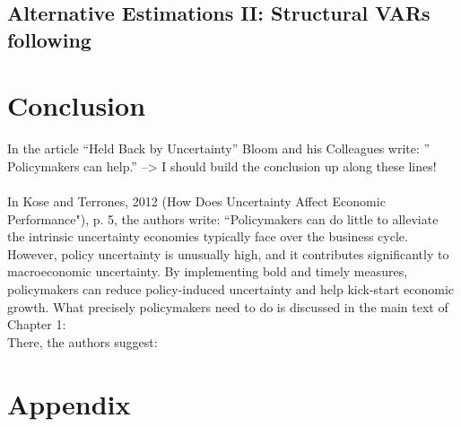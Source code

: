 \documentclass[a4paper,11pt,listof=nochaptergap,oneside,pointednumbers,bibtotoc,bigheadings,liststotoc]{scrbook}
\begin{document}
\section{Alternative Estimations II: Structural VARs following \citet{ludvigsonetal:18}}


\chapter{Conclusion}
\label{Conclusion}


In the article ``Held Back by Uncertainty'' Bloom and his Colleagues write: '' Policymakers can help.'' --> I should build the conclusion up along these lines! \\
\\
In Kose and Terrones, 2012 (How Does Uncertainty Affect Economic Performance"), p. 5, the authors write: ``Policymakers can do little to alleviate the intrinsic uncertainty economies typically face over the business cycle. However, policy uncertainty is unusually high, and it contributes significantly to macroeconomic uncertainty. By implementing bold and timely measures, policymakers can reduce policy-induced uncertainty and help kick-start economic growth. What precisely policymakers need to do is discussed in the main text of Chapter 1:\\
There, the authors suggest: 



\newpage
\appendix


\chapter{Appendix}
\label{VARAndLocalProjection}
\end{document}
